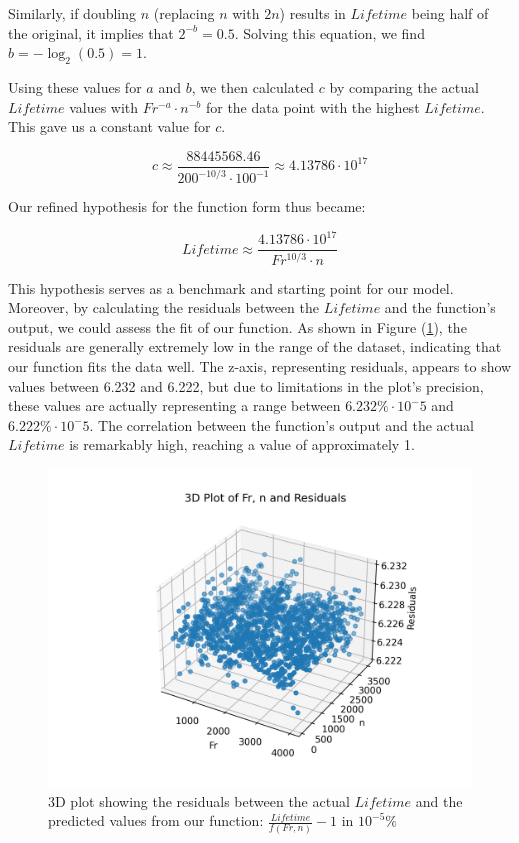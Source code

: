 Similarly, if doubling $n$ (replacing $n$ with $2n$) results in $Lifetime$ being half of the original, it implies that $2^{-b} = 0.5$. Solving this equation, we find $b = -\log_2(0.5) = 1$.

Using these values for $a$ and $b$, we then calculated $c$ by comparing the actual $Lifetime$ values with $Fr^{-a} \cdot n^{-b}$ for the data point with the highest $Lifetime$. This gave us a constant value for $c$.

\begin{equation}
\label{eq:constant_c}
c \approx \frac{88445568.46}{200^{-10/3} \cdot 100^{-1}} \approx 4.13786 \cdot 10^{17}
\end{equation}

Our refined hypothesis for the function form thus became:

\begin{equation}
\label{eq:refined_hypothesis}
{Lifetime} \approx \frac{4.13786 \cdot 10^{17}}{Fr^{10/3} \cdot n}
\end{equation}

This hypothesis serves as a benchmark and starting point for our model. Moreover, by calculating the residuals between the $Lifetime$ and the function's output, we could assess the fit of our function. As shown in Figure (\ref{fig:bearings-residuals}), the residuals are generally extremely low in the range of the dataset, indicating that our function fits the data well. The z-axis, representing residuals, appears to show values between 6.232 and 6.222, but due to limitations in the plot's precision, these values are actually representing a range between $6.232\% \cdot 10^-5$ and $6.222\% \cdot 10^-5$. The correlation between the function's output and the actual $Lifetime$ is remarkably high, reaching a value of approximately 1.

\begin{figure}[ht]
    \centering
    \includegraphics[width=\textwidth]{assets/bearings-eda/3dplot-residuals.png}
    \caption{3D plot showing the residuals between the actual $Lifetime$ and the predicted values from our function: $\frac{Lifetime}{f(Fr, n)} - 1$ in $10^{-5}\%$}
    \label{fig:bearings-residuals}
\end{figure}

